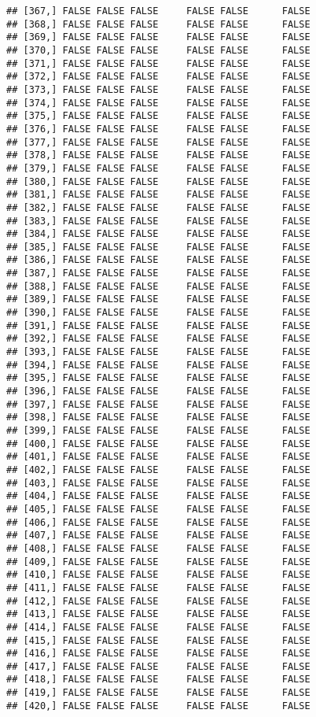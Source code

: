\documentclass[
]{article}
\begin{document}
\begin{verbatim}
## [367,] FALSE FALSE FALSE     FALSE FALSE      FALSE
## [368,] FALSE FALSE FALSE     FALSE FALSE      FALSE
## [369,] FALSE FALSE FALSE     FALSE FALSE      FALSE
## [370,] FALSE FALSE FALSE     FALSE FALSE      FALSE
## [371,] FALSE FALSE FALSE     FALSE FALSE      FALSE
## [372,] FALSE FALSE FALSE     FALSE FALSE      FALSE
## [373,] FALSE FALSE FALSE     FALSE FALSE      FALSE
## [374,] FALSE FALSE FALSE     FALSE FALSE      FALSE
## [375,] FALSE FALSE FALSE     FALSE FALSE      FALSE
## [376,] FALSE FALSE FALSE     FALSE FALSE      FALSE
## [377,] FALSE FALSE FALSE     FALSE FALSE      FALSE
## [378,] FALSE FALSE FALSE     FALSE FALSE      FALSE
## [379,] FALSE FALSE FALSE     FALSE FALSE      FALSE
## [380,] FALSE FALSE FALSE     FALSE FALSE      FALSE
## [381,] FALSE FALSE FALSE     FALSE FALSE      FALSE
## [382,] FALSE FALSE FALSE     FALSE FALSE      FALSE
## [383,] FALSE FALSE FALSE     FALSE FALSE      FALSE
## [384,] FALSE FALSE FALSE     FALSE FALSE      FALSE
## [385,] FALSE FALSE FALSE     FALSE FALSE      FALSE
## [386,] FALSE FALSE FALSE     FALSE FALSE      FALSE
## [387,] FALSE FALSE FALSE     FALSE FALSE      FALSE
## [388,] FALSE FALSE FALSE     FALSE FALSE      FALSE
## [389,] FALSE FALSE FALSE     FALSE FALSE      FALSE
## [390,] FALSE FALSE FALSE     FALSE FALSE      FALSE
## [391,] FALSE FALSE FALSE     FALSE FALSE      FALSE
## [392,] FALSE FALSE FALSE     FALSE FALSE      FALSE
## [393,] FALSE FALSE FALSE     FALSE FALSE      FALSE
## [394,] FALSE FALSE FALSE     FALSE FALSE      FALSE
## [395,] FALSE FALSE FALSE     FALSE FALSE      FALSE
## [396,] FALSE FALSE FALSE     FALSE FALSE      FALSE
## [397,] FALSE FALSE FALSE     FALSE FALSE      FALSE
## [398,] FALSE FALSE FALSE     FALSE FALSE      FALSE
## [399,] FALSE FALSE FALSE     FALSE FALSE      FALSE
## [400,] FALSE FALSE FALSE     FALSE FALSE      FALSE
## [401,] FALSE FALSE FALSE     FALSE FALSE      FALSE
## [402,] FALSE FALSE FALSE     FALSE FALSE      FALSE
## [403,] FALSE FALSE FALSE     FALSE FALSE      FALSE
## [404,] FALSE FALSE FALSE     FALSE FALSE      FALSE
## [405,] FALSE FALSE FALSE     FALSE FALSE      FALSE
## [406,] FALSE FALSE FALSE     FALSE FALSE      FALSE
## [407,] FALSE FALSE FALSE     FALSE FALSE      FALSE
## [408,] FALSE FALSE FALSE     FALSE FALSE      FALSE
## [409,] FALSE FALSE FALSE     FALSE FALSE      FALSE
## [410,] FALSE FALSE FALSE     FALSE FALSE      FALSE
## [411,] FALSE FALSE FALSE     FALSE FALSE      FALSE
## [412,] FALSE FALSE FALSE     FALSE FALSE      FALSE
## [413,] FALSE FALSE FALSE     FALSE FALSE      FALSE
## [414,] FALSE FALSE FALSE     FALSE FALSE      FALSE
## [415,] FALSE FALSE FALSE     FALSE FALSE      FALSE
## [416,] FALSE FALSE FALSE     FALSE FALSE      FALSE
## [417,] FALSE FALSE FALSE     FALSE FALSE      FALSE
## [418,] FALSE FALSE FALSE     FALSE FALSE      FALSE
## [419,] FALSE FALSE FALSE     FALSE FALSE      FALSE
## [420,] FALSE FALSE FALSE     FALSE FALSE      FALSE
\end{verbatim}
\end{document}

